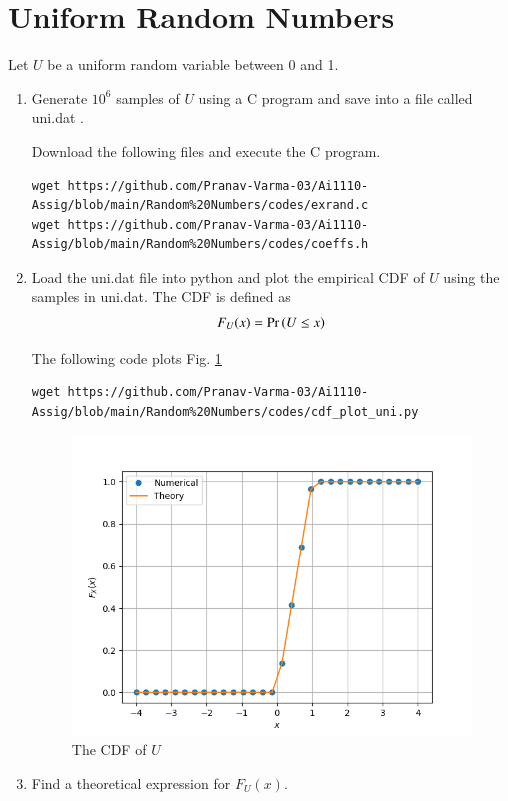 \documentclass[journal,12pt,twocolumn]{IEEEtran}
\renewcommand\thesection{\arabic{section}}
\begin{document}
\section{Uniform Random Numbers}
Let $U$ be a uniform random variable between 0 and 1.
\begin{enumerate}[label=\textbf{\thesection.\arabic*}
,ref=\thesection.\theenumi]
\item Generate $10^6$ samples of $U$ using a C program and save into a file called uni.dat .

\solution Download the following files and execute the  C program.
\begin{lstlisting}
wget https://github.com/Pranav-Varma-03/Ai1110-Assig/blob/main/Random%20Numbers/codes/exrand.c
wget https://github.com/Pranav-Varma-03/Ai1110-Assig/blob/main/Random%20Numbers/codes/coeffs.h
\end{lstlisting}
%
%

\item
Load the uni.dat file into python and plot the empirical CDF of $U$ using the samples in uni.dat. The CDF is defined as
\begin{align}
F_{U}(x) = \Pr\left(U \leq x\right)
\end{align}

\solution  The following code plots Fig. \ref{fig:uni_cdf}
\begin{lstlisting}
wget https://github.com/Pranav-Varma-03/Ai1110-Assig/blob/main/Random%20Numbers/codes/cdf_plot_uni.py
\end{lstlisting}
%
\begin{figure}[!ht]
\centering
\includegraphics[width=\columnwidth]{figs/cdf_plot_uni.png}
\caption{The CDF of $U$}
\label{fig:uni_cdf}
\end{figure}
%
\item
Find a theoretical expression for $F_{U}(x)$.


\end{enumerate}
\end{document}

